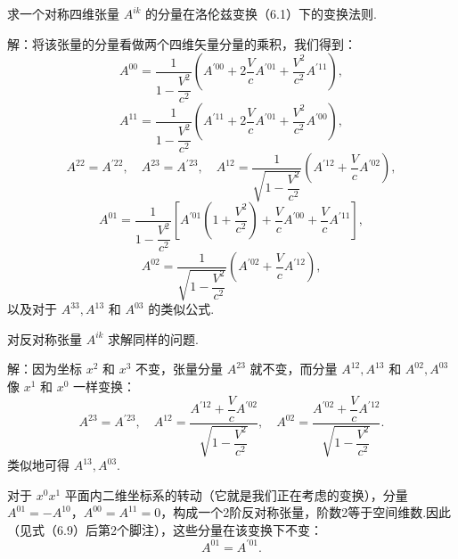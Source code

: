 \begin{xiti}

\quad 求一个对称四维张量 $A^{ik}$ 的分量在洛伦兹变换（6.1）下的变换法则.

解：将该张量的分量看做两个四维矢量分量的乘积，我们得到：
\begin{equation*}
  A^{00}=\frac{1}{1-\dfrac{V^2}{c^2}}
  \left(A^{\prime 00}+2\frac{V}{c}A^{\prime 01}
  +\frac{V^2}{c^2}A^{\prime 11}\right),
\end{equation*}
\begin{equation*}
  A^{11}=\frac{1}{1-\dfrac{V^2}{c^2}}
  \left(A^{\prime 11}+2\frac{V}{c}A^{\prime 01}
  +\frac{V^2}{c^2}A^{\prime 00}\right),
\end{equation*}
\begin{equation*}
  A^{22}=A^{\prime 22},\quad A^{23}=A^{\prime 23},\quad
  A^{12}=\frac{1}{\sqrt{1-\dfrac{V^2}{c^2}}}
  \left(A^{\prime 12}+\frac{V}{c}A^{\prime 02}\right),
\end{equation*}
\begin{equation*}
  A^{01}=\frac{1}{1-\dfrac{V^2}{c^2}}
  \left[A^{\prime 01}\left(1+\frac{V^2}{c^2}\right)
  +\frac{V}{c}A^{\prime 00}+\frac{V}{c}A^{\prime 11}\right],
\end{equation*}
\begin{equation*}
  A^{02}=\frac{1}{\sqrt{1-\dfrac{V^2}{c^2}}}
  \left(A^{\prime 02}+\frac{V}{c}A^{\prime 12}\right),
\end{equation*}
以及对于 $A^{33},A^{13}$ 和 $A^{03}$ 的类似公式.

\quad 对反对称张量 $A^{ik}$ 求解同样的问题.

解：因为坐标 $x^2$ 和 $x^3$ 不变，张量分量 $A^{23}$ 就不变，而分量 $A^{12},A^{13}$ 和 $A^{02},A^{03}$ 像 $x^1$ 和 $x^0$ 一样变换：
\begin{equation*}
  A^{23}=A^{\prime 23},\quad
  A^{12}=\frac{A^{\prime 12}+\dfrac{V}{c}A^{\prime 02}}
  {\sqrt{1-\dfrac{V^2}{c^2}}},\quad
  A^{02}=\frac{A^{\prime 02}+\dfrac{V}{c}A^{\prime 12}}
  {\sqrt{1-\dfrac{V^2}{c^2}}}.
\end{equation*}
类似地可得 $A^{13},A^{03}$.

对于 $x^0x^1$ 平面内二维坐标系的转动（它就是我们正在考虑的变换），分量 $A^{01}=-A^{10}$，$A^{00}=A^{11}=0$，构成一个2阶反对称张量，阶数2等于空间维数.因此（见式（6.9）后第2个脚注），这些分量在该变换下不变：
\begin{equation*}
  A^{01}=A^{\prime 01}.
\end{equation*}

\end{xiti}

